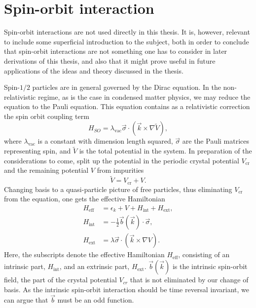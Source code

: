 \section{Spin-orbit interaction}\label{sec:spin-orbit}
Spin-orbit interactions are not used directly in this thesis.
It is, however, relevant to include some superficial introduction to the subject, both in order to conclude that spin-orbit interactions are not something one has to consider in later derivations of this thesis, and also that it might prove useful in future applications of the ideas and theory discussed in the thesis.

Spin-$1 /2$ particles are in general governed by the Dirac equation.
In the non-relativistic regime, as is the case in condensed matter physics, we may reduce the equation to the Pauli equation.
This equation contains as a relativistic correction the spin orbit coupling term~\cite{engelTheorySpinHall2007}
\begin{equation}
  \label{eq:pauli}
  H_{SO} = \lambda_{\text{vac}} \vec{\sigma} \cdot ( \vec{k} \times \nabla \tilde{V}),
\end{equation}
where $\lambda_{\text{vac}}$ is a constant with dimension length squared, $\vec{\sigma}$ are the Pauli matrices representing spin, and $\tilde{V}$ is the total potential in the system.
In preparation of the considerations to come, split up the potential in the periodic crystal potential $V_\text{cr}$ and the remaining potential $V$ from impurities
\begin{equation}
  \tilde{V} = V_{\text{cr}} + V.
\end{equation}
Changing basis to a quasi-particle picture of free particles, thus eliminating $V_\text{cr}$ from the equation, one gets the effective Hamiltonian~\cite{engelTheorySpinHall2007}
\begin{align}
  \label{eq:Heff}
  H_\text{eff} &= \epsilon_k + V + H_\text{int} + H_\text{ext},\\
  H_\text{int} &= -\frac12 \vec{b}(\vec{k}) \cdot \vec{\sigma},\\
  H_\text{ext} &= \lambda \vec{\sigma} \cdot( \vec{k} \times \nabla V).
\end{align}
Here, the subscripts denote the effective Hamiltonian $H_{\text{eff}}$, consisting of an intrinsic part, $H_{\text{int}}$, and an extrinsic part, $H_{\text{ext}}$.
$\vec{b}(\vec{k})$ is the intrinsic spin-orbit field, the part of the crystal potential $V_{cr}$ that is not eliminated by our change of basis.
As the intrinsic spin-orbit interaction should be time reversal invariant, we can argue that $\vec{b}$ must be an odd function.
